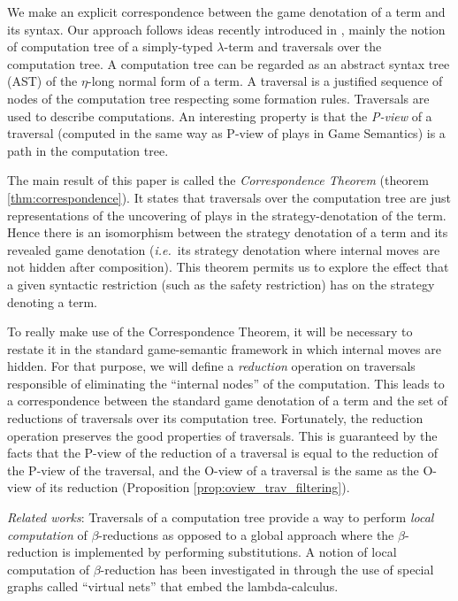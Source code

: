 We make an explicit correspondence between the game denotation of a
term and its syntax. Our approach follows ideas recently introduced
in \cite{OngLics2006}, mainly the notion of computation tree of a
simply-typed $\lambda$-term and traversals over the computation
tree. A computation tree can be regarded as an abstract syntax tree
(AST) of the $\eta$-long normal form of a term. A traversal is a
justified sequence of nodes of the computation tree respecting some
formation rules. Traversals are used to describe computations. An
interesting property is that the \emph{P-view} of a traversal
(computed in the same way as P-view of plays in Game Semantics) is a
path in the computation tree.

The main result of this paper is called the
\emph{Correspondence Theorem} (theorem \ref{thm:correspondence}). It
states that traversals over the computation tree are just
representations of the uncovering of plays in the
strategy-denotation of the term. Hence there is an isomorphism
between the strategy denotation of a term and its revealed game
denotation ({\it i.e.}~its strategy denotation where internal moves are
not hidden after composition). This theorem permits us to explore
the effect that a given syntactic restriction (such as the safety restriction) has on the strategy
denoting a term.

To really make use of the Correspondence Theorem, it will be
necessary to restate it in the standard game-semantic framework in
which internal moves are hidden. For that purpose, we will define a
\emph{reduction} operation on traversals responsible of eliminating
the ``internal nodes'' of the computation. This leads to a
correspondence between the standard game denotation of a term and
the set of reductions of traversals over its computation tree.
Fortunately, the reduction operation preserves the good properties
of traversals. This is guaranteed by the facts that the P-view of
the reduction of a traversal is equal to the reduction of the P-view
of the traversal, and the O-view of a traversal is the same as the
O-view of its reduction (Proposition \ref{prop:oview_trav_filtering}).
\vspace{8pt}

\emph{Related works}: Traversals of a computation tree provide a way
to perform \emph{local computation} of $\beta$-reductions as opposed
to a global approach where the $\beta$-reduction is implemented by
performing substitutions. A notion of local computation of
$\beta$-reduction has been investigated in
\cite{DanosRegnier-Localandasynchronou} through the use of special
graphs called ``virtual nets'' that embed the lambda-calculus.

